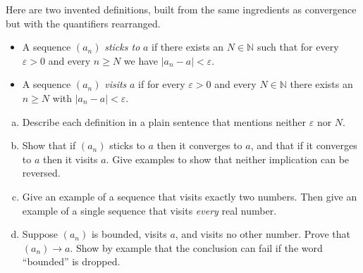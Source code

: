 \begin{problem}
Here are two invented definitions, built from the same ingredients as convergence but with the quantifiers rearranged.
\begin{itemize}
	\item A sequence $(a_n)$ \emph{sticks to} $a$ if there exists an $N \in \mathbb{N}$ such that for every $\varepsilon > 0$ and every $n \geq N$ we have $|a_n - a| < \varepsilon$.
	\item A sequence $(a_n)$ \emph{visits} $a$ if for every $\varepsilon > 0$ and every $N \in \mathbb{N}$ there exists an $n \geq N$ with $|a_n - a| < \varepsilon$.
\end{itemize}
\begin{enumerate}[(a)]
	\item Describe each definition in a plain sentence that mentions neither $\varepsilon$ nor $N$.
	\item Show that if $(a_n)$ sticks to $a$ then it converges to $a$, and that if it converges to $a$ then it visits $a$.  Give examples to show that neither implication can be reversed.
	\item Give an example of a sequence that visits exactly two numbers.  Then give an example of a single sequence that visits \emph{every} real number.
	\item Suppose $(a_n)$ is bounded, visits $a$, and visits no other number.  Prove that $(a_n) \to a$.  Show by example that the conclusion can fail if the word ``bounded'' is dropped.
\end{enumerate}
\end{problem}

